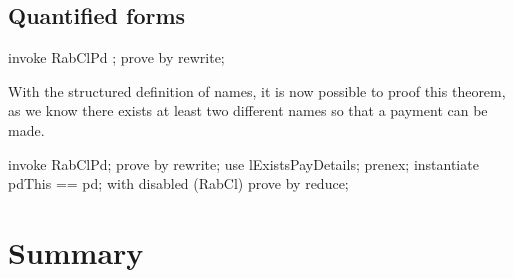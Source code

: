 \subsection{Quantified forms}

\begin{LPScript}\begin{zproof}[tRetrieveForAllRabClPd]
   invoke RabClPd ;
   prove by rewrite;
\end{zproof}\end{LPScript}

With the structured definition of names, it is now possible to proof
this theorem, as we know there exists at least two different names so
that a payment can be made.
%
\begin{LPScript}\begin{zproof}[tRetrieveExistsRabClPd]
    invoke RabClPd;
    prove by rewrite;
    use lExistsPayDetails;
    prenex;
    instantiate pdThis == pd;
    with disabled (RabCl) prove by reduce;
\end{zproof}\end{LPScript}

\newpage
\section{Summary}\label{ch10.ps.summary}
\lpscriptsummary
